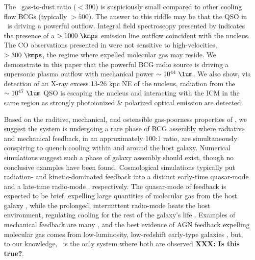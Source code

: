 \documentclass[useAMS,usenatbib]{mn2e}
\begin{document}
The \irs\ gas-to-dust ratio ($< 300$) is suspiciously small compared
to other cooling flow BCGs (typically $> 500$). The answer to this
riddle may be that the QSO in \irs\ is driving a powerful
outflow. Integral field spectroscopy presented by
\citet{1996MNRAS.283.1003C} indicates the presence of a $> 1000
~\kmps$ emission line outflow coincident with the nucleus. The CO
observations presented in \citet{1998ApJ...506..205E} were not
sensitive to high-velocities, $> 300 ~\kmps$, the regime where
expelled molecular gas may reside. We demonstrate in this paper that
the powerful BCG radio source is driving a supersonic plasma outflow
with mechanical power $\sim 10^{44} ~\lum$. We also show, via
detection of an X-ray excess 13-26 kpc NE of the nucleus, radiation
from the $\sim 10^{47} ~\lum$ QSO is escaping the nucleus and
interacting with the ICM in the same region as strongly photoionized
\& polarized optical emission are detected.

Based on the raditive, mechanical, and ostensible gas-poorness
properties of \irs, we suggest the system is undergoing a rare phase
of BCG assembly where radiative and mechanical feedback, in an
approximately 100:1 ratio, are simultaneously conspiring to quench
cooling within and around the host galaxy. Numerical simulations
suggest such a phase of galaxy assembly should exist, though no
conclusive examples have been found. Cosmological simulations
typically put radiation- and kinetic-dominated feedback into a
distinct early-time quasar-mode \citep[\eg][]{2005Natur.435..629S} and
a late-time radio-mode \citep[\eg][]{croton06, bower08},
respectively. The quasar-mode of feedback is expected to be brief,
expelling large quantities of molecular gas from the host galaxy
\citep{2006ApJ...642L.107N}, while the prolonged, intermittent
radio-mode heats the host environment, regulating cooling for the rest
of the galaxy's life \citep[see][for a review]{mcnamrev}. Examples of
mechanical feedback are many \citep[\eg][]{perseus1, ms0735}, and the
best evidence of AGN feedback expelling molecular gas comes from
low-luminosity, low-redshift early-type galaxies
\citep[\eg][]{2009ApJ...690.1672S}, but, to our knowledge, \irs\ is
the only system where both are observed {\bf{XXX: Is this true?}}.
\end{document}

